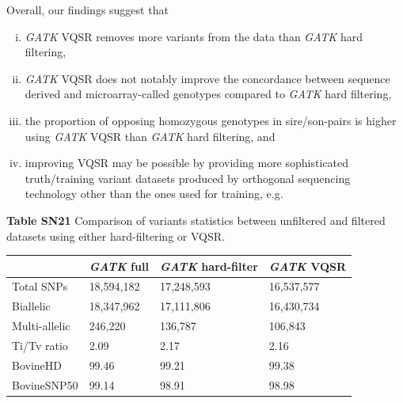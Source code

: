 \documentclass[../main.tex]{subfiles}
\begin{document}
\begin{flushleft}
Overall, our findings suggest that
\vspace{-2em}
\begin{enumerate}[(i)]
    \item \emph{GATK} VQSR removes more variants from the data than \emph{GATK} hard filtering,
    \item \emph{GATK} VQSR does not notably improve the concordance between sequence derived and microarray-called genotypes compared to \emph{GATK} hard filtering,
    \item the proportion of opposing homozygous genotypes in sire/son-pairs is higher using \emph{GATK} VQSR than \emph{GATK} hard filtering, and
    \item improving VQSR may be possible by providing more sophisticated truth/training variant datasets produced by orthogonal sequencing technology other than the ones used for training, e.g. \citet{li2018synthetic}
\end{enumerate}

\textbf{\hypertarget{Table SN21}{Table SN21}} Comparison of variants statistics between unfiltered and filtered datasets using
either hard-filtering or VQSR.


\bigskip

\begin{center}
\begin{tabular}{|l|l|l|l|} 
    \cline{2-4}
    \multicolumn{1}{l|}{~} & \textit{GATK} full & \textit{GATK }hard-filter & \textit{GATK} VQSR  \\ 
    \hline
    Total SNPs             & 18,594,182         & 17,248,593                & 16,537,577          \\ 
    \hline
    Biallelic              & 18,347,962         & 17,111,806                & 16,430,734          \\ 
    \hline
    Multi-allelic          & 246,220            & 136,787                   & 106,843             \\ 
    \hline
    Ti/Tv ratio            & 2.09               & 2.17                      & 2.16                \\ 
    \hline
    BovineHD               & 99.46              & 99.21                     & 99.38               \\ 
    \hline
    BovineSNP50            & 99.14              & 98.91                     & 98.98               \\
    \hline
    \end{tabular}
\end{center}


\end{flushleft}
\end{document}
